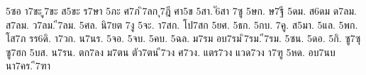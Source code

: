 {5ซอ
า7ขะ
ู7ขะ
ส5ขะ
ร7ษา
5ภะ
ศ7ภ
ิ7ลก
ุ7ฎี
ศา5ข
5สา.
ั6สา
7ซู
5ษก.
ษ7ฐี
5ดม.
ส6ดม
ด7ลม.
ส7ลม.
ว7ลม.
ี7ลม.
5ศล.
นิ7ยต
7งู
5จะ.
า7สก.
โป7สก
5ยศ.
5ธก.
5กบ.
7คู.
ส5มา.
5แล.
5พก.
โส7ภ
รร6ดิ.
า7วก.
น7นร.
5จอ.
5จบ.
5คบ.
5ฉล.
ม7รม
อบ7รม
ิ7รม.
ี7รม.
5ซน.
5ดอ.
5กิ.
ซู7ซุ
ซู7ฮก
5บส.
น7รน.
ตก7ลง
ม7ตน
ตัว7ตน
ี7วง
ศ7วง.
แตร7วง
แวด7วง
า7ฑู
5หด.
อบ7นบ
นา7คร.
ี7ฑา
}
